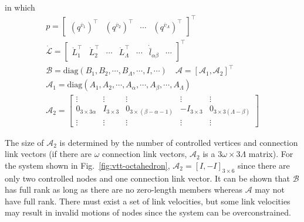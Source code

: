 \documentclass[journal]{IEEEtran}
\begin{document}
in which
\begin{gather*}
  p = \left[
    \begin{array}{cccc}
      (q^{\bar{v}_1})^{\intercal}& (q^{\bar{v}_2})^{\intercal} & \cdots& (q^{\bar{v}_\Lambda})^{\intercal}
    \end{array}
  \right]^\intercal\\
  \dot{\mathcal{L}} = \left[
    \begin{array}{ccccccc}
      \dot{L}_1^\intercal&\dot{L}_2^\intercal&\cdots&\dot{L}_\Lambda^\intercal&\cdots
      &\dot{\bar{l}}_{\alpha\beta}& \cdots
    \end{array}\right]^\intercal\\
  \mathcal{B} =\mathrm{diag} (B_1, B_2, \cdots,
  B_\Lambda, \cdots, I, \cdots)\quad
  \mathcal{A} = \left[\mathcal{A}_1, \mathcal{A}_2\right]^\intercal\\
  \mathcal{A}_1 = \mathrm{diag} (A_1, A_2, \cdots,
  A_\alpha, \cdots, A_\beta, \cdots, A_\Lambda)\\
  \mathcal{A}_2 = \left[
    \begin{array}{ccccc}
      \vdots&\vdots&\vdots&\vdots&\vdots\\
      0_{3\times3\alpha}&I_{3\times3}&0_{3\times(\beta-\alpha-1)}&-I_{3\times3}&0_{3\times3(\Lambda-\beta)}\\
      \vdots&\vdots&\vdots&\vdots&\vdots
    \end{array}
  \right]
\end{gather*}

The size of $\mathcal{A}_2$ is determined by the number of controlled
vertices and connection link vectors (if there are $\omega$ connection
link vectors, $\mathcal{A}_2$ is a $3\omega\times 3\Lambda$
matrix). For the system shown in Fig.~\ref{fig:vtt-octahedron},
$\mathcal{A}_2 = \left[I, -I\right]_{3\times 6}$ since there are only
two controlled nodes and one connection link vector. It can be shown
that $\mathcal{B}$ has full rank as long as there are no zero-length
members whereas $\mathcal{A}$ may not have full rank. There must exist
a set of link velocities, but some link velocities may result in
invalid motions of nodes since the system can be overconstrained.
\end{document}
